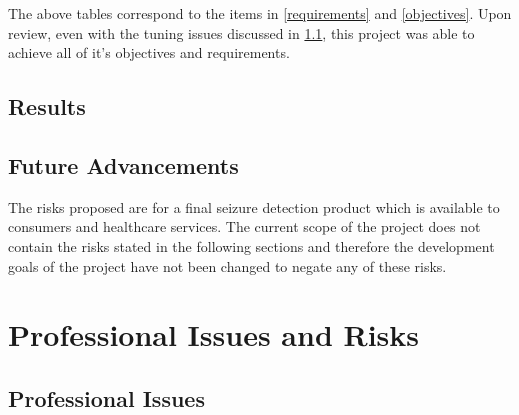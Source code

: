 \documentclass[12pt]{article}
\begin{document}
The above tables correspond to the items in \ref{requirements} and \ref{objectives}. Upon review, even with the tuning issues discussed in \ref{issues}, this project was able to achieve all of it's objectives and requirements. 

\subsection{Results}\label{results}




\subsection{Future Advancements}

The risks proposed are for a final seizure detection product which is available to consumers and healthcare services. The current scope of the project does not contain the risks stated in the following sections and therefore the development goals of the project have not been changed to negate any of these risks.

\section{Professional Issues and Risks}

\subsection{Professional Issues}\label{issues}
\end{document}
